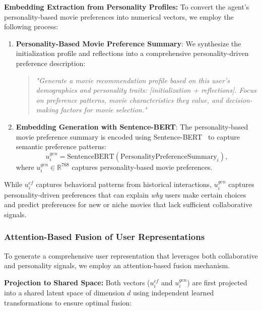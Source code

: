 \documentclass[acmsmall]{acmart}
\begin{document}
\textbf{Embedding Extraction from Personality Profiles:} To convert the agent's personality-based movie preferences into numerical vectors, we employ the following process:

\begin{enumerate}
    \item \textbf{Personality-Based Movie Preference Summary}: We synthesize the initialization profile and reflections into a comprehensive personality-driven preference description:
    \begin{quote}
    \textit{"Generate a movie recommendation profile based on this user's demographics and personality traits: [initialization + reflections]. Focus on preference patterns, movie characteristics they value, and decision-making factors for movie selection."}
    \end{quote}
    
    \item \textbf{Embedding Generation with Sentence-BERT}: The personality-based movie preference summary is encoded using Sentence-BERT~\cite{reimers2019sentence} to capture semantic preference patterns:
    \begin{equation}
    u^{gen}_i = \text{SentenceBERT}(\text{PersonalityPreferenceSummary}_i),    \label{eq:personality_encoding}
    \end{equation}
    where $u^{gen}_i\in \mathbb{R}^{768}$ captures personality-based movie preferences.
    

\end{enumerate}

 While $u^{cf}_i$ captures behavioral patterns from historical interactions, $u^{gen}_i$ captures personality-driven preferences that can explain \textit{why} users make certain choices and predict preferences for new or niche movies that lack sufficient collaborative signals.

\subsubsection{Attention-Based Fusion of User Representations}
\label{sec:attention_fusion}

To generate a comprehensive user representation that leverages both collaborative and personality signals, we employ an attention-based fusion mechanism.

\textbf{Projection to Shared Space:} Both vectors ($u^{cf}_i$ and $u^{gen}_i$) are first projected into a shared latent space of dimension $d$ using independent learned transformations to ensure optimal fusion:
\end{document}
